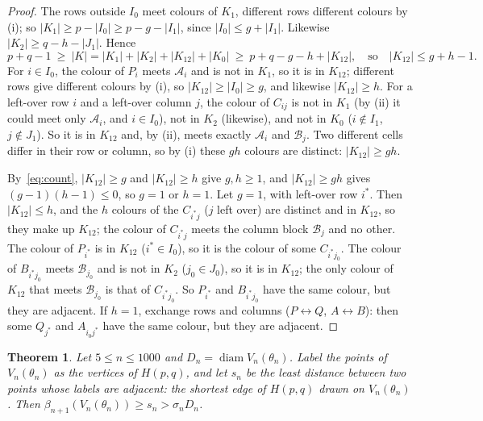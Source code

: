 \documentclass[10pt,a4paper,reqno]{amsart}
\newtheorem{theorem}{Theorem}
\DeclareMathOperator{\diam}{diam}
\newcommand{\RB}{\mathcal A}
\newcommand{\CB}{\mathcal B}
\begin{document}
\begin{proof}
The rows outside $I_0$ meet colours of $K_1$, different rows different colours by (i); so $|K_1|\ge p-|I_0|\ge p-g-|I_1|$, since $|I_0|\le g+|I_1|$. Likewise $|K_2|\ge q-h-|J_1|$. Hence
\begin{equation}\label{eq:count}
p+q-1\ \ge\ |K|=|K_1|+|K_2|+|K_{12}|+|K_0|\ \ge\ p+q-g-h+|K_{12}|,\quad\text{so}\quad |K_{12}|\le g+h-1.
\end{equation}
For $i\in I_0$, the colour of $P_i$ meets $\RB_i$ and is not in $K_1$, so it is in $K_{12}$; different rows give different colours by (i), so $|K_{12}|\ge|I_0|\ge g$, and likewise $|K_{12}|\ge h$. For a left-over row $i$ and a left-over column $j$, the colour of $C_{ij}$ is not in $K_1$ (by (ii) it could meet only $\RB_i$, and $i\in I_0$), not in $K_2$ (likewise), and not in $K_0$ ($i\notin I_1$, $j\notin J_1$). So it is in $K_{12}$ and, by (ii), meets exactly $\RB_i$ and $\CB_j$. Two different cells differ in their row or column, so by (i) these $gh$ colours are distinct: $|K_{12}|\ge gh$.

By~\eqref{eq:count}, $|K_{12}|\ge g$ and $|K_{12}|\ge h$ give $g,h\ge 1$, and $|K_{12}|\ge gh$ gives $(g-1)(h-1)\le 0$, so $g=1$ or $h=1$. Let $g=1$, with left-over row $i^*$. Then $|K_{12}|\le h$, and the $h$ colours of the $C_{i^*j}$ ($j$ left over) are distinct and in $K_{12}$, so they make up $K_{12}$; the colour of $C_{i^*j}$ meets the column block $\CB_j$ and no other. The colour of $P_{i^*}$ is in $K_{12}$ ($i^*\in I_0$), so it is the colour of some $C_{i^*j_0}$. The colour of $B_{i^*j_0}$ meets $\CB_{j_0}$ and is not in $K_2$ ($j_0\in J_0$), so it is in $K_{12}$; the only colour of $K_{12}$ that meets $\CB_{j_0}$ is that of $C_{i^*j_0}$. So $P_{i^*}$ and $B_{i^*j_0}$ have the same colour, but they are adjacent. If $h=1$, exchange rows and columns ($P\leftrightarrow Q$, $A\leftrightarrow B$): then some $Q_{j^*}$ and $A_{i_0j^*}$ have the same colour, but they are adjacent.
\end{proof}

\begin{theorem}\label{thm:family}
Let $5\le n\le 1000$ and $D_n=\diam V_n(\theta_n)$. Label the points of $V_n(\theta_n)$ as the vertices of $H(p,q)$, and let $s_n$ be the least distance between two points whose labels are adjacent: the shortest edge of $H(p,q)$ drawn on $V_n(\theta_n)$. Then $\beta_{n+1}(V_n(\theta_n))\ge s_n>\sigma_n D_n$.
\end{theorem}
\end{document}
